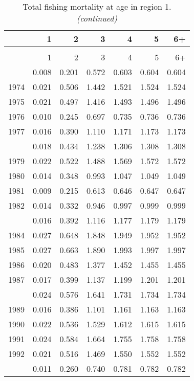\documentclass[
]{article}
\begin{document}
\begin{longtable}[t]{lrrrrrr}
\caption{\label{tab:region_1-region-FAA-table}Total fishing mortality at age in region 1.}\\
\toprule
  & 1 & 2 & 3 & 4 & 5 & 6+\\
\midrule
\endfirsthead
\caption[]{Total fishing mortality at age in region 1. \textit{(continued)}}\\
\toprule
  & 1 & 2 & 3 & 4 & 5 & 6+\\
\midrule
\endhead

\endfoot
\bottomrule
\endlastfoot
1973 & 0.008 & 0.201 & 0.572 & 0.603 & 0.604 & 0.604\\
1974 & 0.021 & 0.506 & 1.442 & 1.521 & 1.524 & 1.524\\
1975 & 0.021 & 0.497 & 1.416 & 1.493 & 1.496 & 1.496\\
1976 & 0.010 & 0.245 & 0.697 & 0.735 & 0.736 & 0.736\\
1977 & 0.016 & 0.390 & 1.110 & 1.171 & 1.173 & 1.173\\
\addlinespace
1978 & 0.018 & 0.434 & 1.238 & 1.306 & 1.308 & 1.308\\
1979 & 0.022 & 0.522 & 1.488 & 1.569 & 1.572 & 1.572\\
1980 & 0.014 & 0.348 & 0.993 & 1.047 & 1.049 & 1.049\\
1981 & 0.009 & 0.215 & 0.613 & 0.646 & 0.647 & 0.647\\
1982 & 0.014 & 0.332 & 0.946 & 0.997 & 0.999 & 0.999\\
\addlinespace
1983 & 0.016 & 0.392 & 1.116 & 1.177 & 1.179 & 1.179\\
1984 & 0.027 & 0.648 & 1.848 & 1.949 & 1.952 & 1.952\\
1985 & 0.027 & 0.663 & 1.890 & 1.993 & 1.997 & 1.997\\
1986 & 0.020 & 0.483 & 1.377 & 1.452 & 1.455 & 1.455\\
1987 & 0.017 & 0.399 & 1.137 & 1.199 & 1.201 & 1.201\\
\addlinespace
1988 & 0.024 & 0.576 & 1.641 & 1.731 & 1.734 & 1.734\\
1989 & 0.016 & 0.386 & 1.101 & 1.161 & 1.163 & 1.163\\
1990 & 0.022 & 0.536 & 1.529 & 1.612 & 1.615 & 1.615\\
1991 & 0.024 & 0.584 & 1.664 & 1.755 & 1.758 & 1.758\\
1992 & 0.021 & 0.516 & 1.469 & 1.550 & 1.552 & 1.552\\
\addlinespace
1993 & 0.011 & 0.260 & 0.740 & 0.781 & 0.782 & 0.782\\

\end{longtable}
\end{document}
